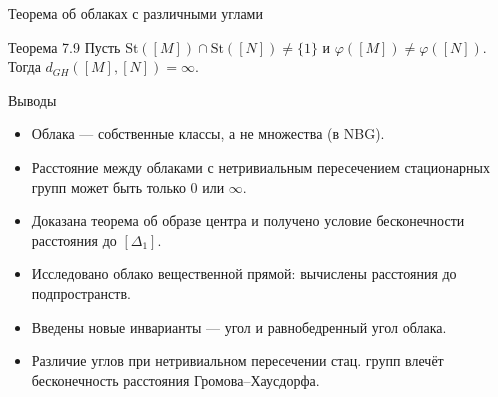 \documentclass[12pt]{beamer}
\begin{document}
\begin{frame}{Теорема об облаках с различными углами}
  \begin{block}{Теорема 7.9}
    Пусть $\mathrm{St}([M])\cap\mathrm{St}([N])\neq\{1\}$ и
    $\varphi([M])\neq\varphi([N])$. Тогда $d_{GH}([M],[N])=\infty$.
  \end{block}
\end{frame}

\begin{frame}{Выводы}
  \begin{itemize}
    \item Облака --- собственные классы, а не множества (в NBG).
    \item Расстояние между облаками с нетривиальным пересечением
      стационарных групп может быть только $0$ или $\infty$.
    \item Доказана теорема об образе центра и получено условие
      бесконечности расстояния до $[\Delta_1]$.
    \item Исследовано облако вещественной прямой: вычислены расстояния
      до подпространств.
    \item Введены новые инварианты --- угол и равнобедренный угол облака.
    \item Различие углов при нетривиальном пересечении стац. групп
      влечёт бесконечность расстояния Громова–Хаусдорфа.
  \end{itemize}
\end{frame}
\nocite{*}
\printbibliography
\end{document}

